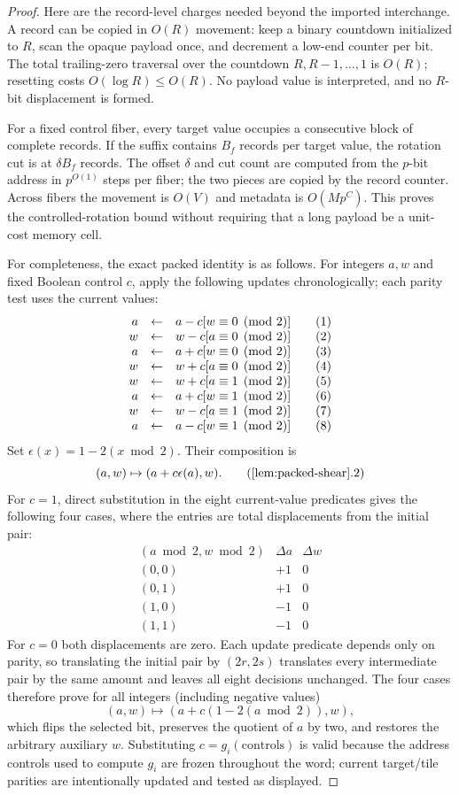 \begin{proof}
Here are the record-level charges needed beyond the imported interchange. A record can be copied in $O(R)$ movement: keep a binary countdown initialized to $R$, scan the opaque payload once, and decrement a low-end counter per bit. The total trailing-zero traversal over the countdown $R,R-1,\ldots,1$ is $O(R)$; resetting costs $O(\log R)\le O(R)$. No payload value is interpreted, and no $R$-bit displacement is formed.

For a fixed control fiber, every target value occupies a consecutive block of complete records. If the suffix contains $B_f$ records per target value, the rotation cut is at $\delta B_f$ records. The offset $\delta$ and cut count are computed from the $p$-bit address in $p^{O(1)}$ steps per fiber; the two pieces are copied by the record counter. Across fibers the movement is $O(V)$ and metadata is $O(Mp^C)$. This proves the controlled-rotation bound without requiring that a long payload be a unit-cost memory cell.

For completeness, the exact packed identity is as follows. For integers $a,w$ and fixed Boolean control $c$, apply the following updates chronologically; each parity test uses the current values:
\[
\begin{array}{rcl@{\qquad}l}
a&\leftarrow&a-c[w\equiv0\pmod2] &(1)\\
w&\leftarrow&w-c[a\equiv0\pmod2] &(2)\\
a&\leftarrow&a+c[w\equiv0\pmod2] &(3)\\
w&\leftarrow&w+c[a\equiv0\pmod2] &(4)\\
w&\leftarrow&w+c[a\equiv1\pmod2] &(5)\\
a&\leftarrow&a+c[w\equiv1\pmod2] &(6)\\
w&\leftarrow&w-c[a\equiv1\pmod2] &(7)\\
a&\leftarrow&a-c[w\equiv1\pmod2] &(8)
\end{array}
\]
Set $\epsilon(x)=1-2(x\bmod2)$. Their composition is
\[
 (a,w)\mapsto(a+c\epsilon(a),w).
 \tag{\ref{lem:packed-shear}.2}
\]
For $c=1$, direct substitution in the eight current-value predicates gives the following four cases, where the entries are total displacements from the initial pair:
\[
\begin{array}{c|c|c}
(a\bmod2,w\bmod2)&\Delta a&\Delta w\\\hline
(0,0)&+1&0\\
(0,1)&+1&0\\
(1,0)&-1&0\\
(1,1)&-1&0
\end{array}
\]
For $c=0$ both displacements are zero. Each update predicate depends only on parity, so translating the initial pair by $(2r,2s)$ translates every intermediate pair by the same amount and leaves all eight decisions unchanged. The four cases therefore prove for all integers (including negative values)
\[
(a,w)\longmapsto(a+c(1-2(a\bmod2)),w),
\]
which flips the selected bit, preserves the quotient of $a$ by two, and restores the arbitrary auxiliary $w$. Substituting $c=g_i(\mathrm{controls})$ is valid because the address controls used to compute $g_i$ are frozen throughout the word; current target/tile parities are intentionally updated and tested as displayed.


\end{proof}
